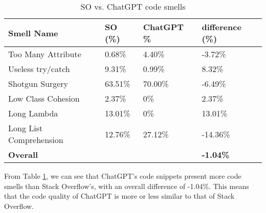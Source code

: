 \begin{table}[!ht]
    \centering
    \caption{SO vs. ChatGPT code smells}
    \begin{tabular}{llll}
        \hline
        \textbf{Smell Name}     & \textbf{SO (\%)} & \textbf{ChatGPT \%} & \textbf{ difference (\%) } \\ \hline
        Too Many Attribute      & 0.68\%           & 4.40\%              & -3.72\%                    \\
        Useless try/catch       & 9.31\%           & 0.99\%              & 8.32\%                     \\
        Shotgun Surgery         & 63.51\%          & 70.00\%             & -6.49\%                    \\
        Low Class Cohesion      & 2.37\%           & 0\%                 & 2.37\%                     \\
        Long Lambda             & 13.01\%          & 0\%                 & 13.01\%                    \\
        Long List Comprehension & 12.76\%          & 27.12\%             & -14.36\%                   \\
        \textbf{Overall}        &                  & ~                   & \textbf{-1.04\%}           \\ \hline
    \end{tabular}
    \label{table:result-comparison}
\end{table}

From Table \ref{table:result-comparison}, we can see that ChatGPT's code snippets present more code smells than Stack Overflow's, with an overall difference of -1.04\%. This means that the code quality of ChatGPT is more or less similar to that of Stack Overflow. \\